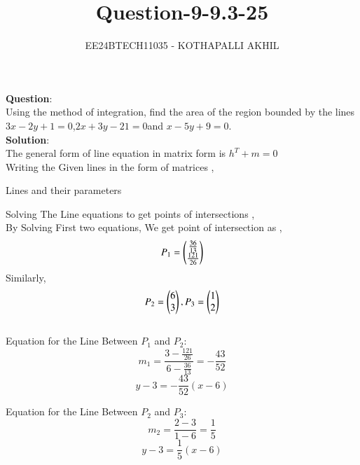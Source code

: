 \documentclass[journal]{IEEEtran}
\begin{document}

\title{Question-9-9.3-25}
\author{EE24BTECH11035 - KOTHAPALLI AKHIL}
{\let\newpage\relax\maketitle}
\vspace{-10mm}
\textbf{Question}:\\
Using the method of integration, find the area of the region bounded by the lines
$3x-2y+1=0$,$2x+3y-21=0$and $x-5y+9=0$.\\
\textbf{Solution}:\\
The general form of line equation in matrix form is $h^T+m=0$\\
   Writing the Given lines in the form of matrices ,
\begin{table}[h!]
   \centering
   
   \caption{Lines and their parameters}
   \label{tabQuestion-9-9.3-25}
\end{table}   
 
   Solving The Line equations to get points of intersections ,\\
   By Solving First two equations, We get point of intersection as ,
   \begin{equation}
       P_1=\begin{pmatrix}\frac{36}{13} \\ \frac{121}{26}\end{pmatrix}
   \end{equation}
Similarly, 
\begin{equation}
     P_2=\begin{pmatrix}6\\3\end{pmatrix} ,
     P_3=\begin{pmatrix}1\\2\end{pmatrix}
\end{equation} \\
Equation for the Line Between $P_1$ and $P_2$:\\
\begin{equation}
m_1 = \frac{3 - \frac{121}{26}}{6 - \frac{36}{13}} = -\frac{43}{52}
\end{equation}
\begin{equation}
y - 3 = -\frac{43}{52}(x - 6)
\end{equation}

Equation for the Line Between $P_2$ and $P_3$:\\
\begin{equation}
m_2 = \frac{2 - 3}{1 - 6} = \frac{1}{5}
\end{equation}
\begin{equation}
y - 3 = \frac{1}{5}(x - 6)
\end{equation}
\end{document}
